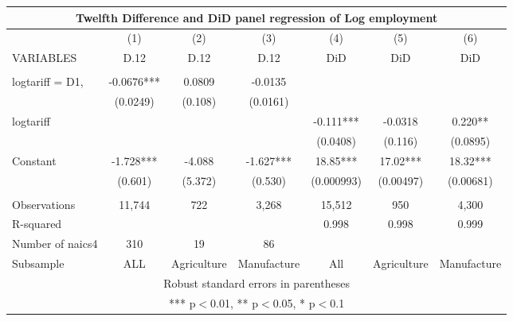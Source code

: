 \begin{tabular}{lcccccc}
\multicolumn{7}{c}{Twelfth Difference and DiD panel regression of Log employment} \\ \hline
 & (1) & (2) & (3) & (4) & (5) & (6) \\
VARIABLES & D.12 & D.12 & D.12 & DiD & DiD & DiD \\ \hline
 &  &  &  &  &  &  \\
logtariff = D1, & -0.0676*** & 0.0809 & -0.0135 &  &  &  \\
 & (0.0249) & (0.108) & (0.0161) &  &  &  \\
logtariff &  &  &  & -0.111*** & -0.0318 & 0.220** \\
 &  &  &  & (0.0408) & (0.116) & (0.0895) \\
Constant & -1.728*** & -4.088 & -1.627*** & 18.85*** & 17.02*** & 18.32*** \\
 & (0.601) & (5.372) & (0.530) & (0.000993) & (0.00497) & (0.00681) \\
 &  &  &  &  &  &  \\
Observations & 11,744 & 722 & 3,268 & 15,512 & 950 & 4,300 \\
R-squared &  &  &  & 0.998 & 0.998 & 0.999 \\
Number of naics4 & 310 & 19 & 86 &  &  &  \\
 Subsample & ALL & Agriculture & Manufacture & All & Agriculture & Manufacture \\ \hline
\multicolumn{7}{c}{ Robust standard errors in parentheses} \\
\multicolumn{7}{c}{ *** p$<$0.01, ** p$<$0.05, * p$<$0.1} \\
\end{tabular}

